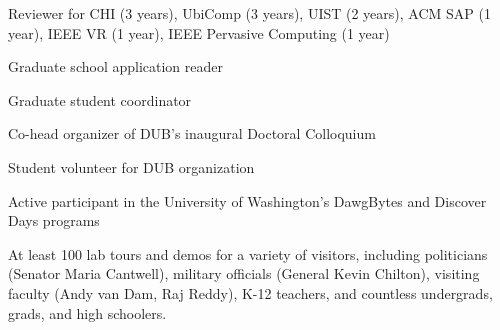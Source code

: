 
Reviewer for CHI (3 years), UbiComp (3 years), UIST (2 years), ACM SAP (1 year), IEEE VR (1 year), IEEE Pervasive Computing (1 year) \\
\vspace{7pt}

Graduate school application reader \\
\vspace{7pt}

Graduate student coordinator \\
\vspace{7pt}

Co-head organizer of DUB's inaugural Doctoral Colloquium \\
\vspace{7pt}

Student volunteer for DUB organization \\
\vspace{7pt}

Active participant in the University of Washington's DawgBytes and Discover Days programs \\
\vspace{7pt}

At least 100 lab tours and demos for a variety of visitors, including politicians (Senator Maria Cantwell), military officials (General Kevin Chilton), visiting faculty (Andy van Dam, Raj Reddy), K-12 teachers, and countless undergrads, grads, and high schoolers.